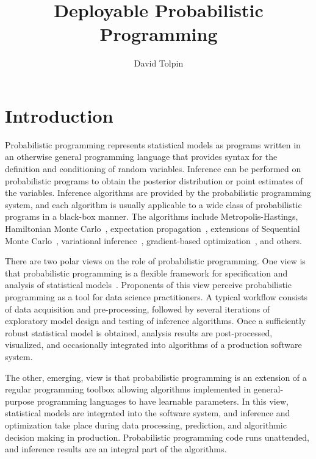 \documentclass[sigplan,review,10pt,anonymous]{acmart}
\title{Deployable Probabilistic Programming}
\author{David Tolpin}
\affiliation{
    \institution{PUB+}
    \country{Israel}
}
\begin{document}
\maketitle

\begin{sloppypar}

\section{Introduction}

	Probabilistic programming \cite{GMR+08,MSP14,WVM14,GS15}
	represents statistical models as programs written in an
	otherwise general programming language that provides syntax
	for the definition and conditioning of random variables.
	Inference can be performed on probabilistic programs to
	obtain the posterior distribution or point estimates of the
	variables. Inference algorithms are provided by the
	probabilistic programming system, and each algorithm is
	usually applicable to a wide class of probabilistic programs
	in a black-box manner. The algorithms include
	Metropolis-Hastings\cite{WSG11,MSP14,YHG14}, Hamiltonian
	Monte Carlo~\cite{Stan17}, expectation
	propagation~\cite{MWG+10}, extensions of Sequential Monte
	Carlo~\cite{WVM14,MYM+15,PWD+14,RNL+2016}, variational
	inference~\cite{WW13,KTR+17}, gradient-based
	optimization~\cite{Stan17,BCJ+19}, and others.

	There are two polar views on the role of probabilistic
	programming.  One view is that probabilistic programming is
	a flexible framework for specification and analysis of
	statistical models~\cite{WSG11,TMY+16,GXG18}. Proponents of
	this view perceive probabilistic programming as a tool for
	data science practitioners. A typical workflow consists of
	data acquisition and pre-processing, followed by several
	iterations of exploratory model design and testing of
	inference algorithms. Once a sufficiently robust statistical
	model is obtained, analysis results are post-processed,
	visualized, and occasionally integrated into algorithms of a
	production software system. 

	The other, emerging, view is that probabilistic programming
	is an extension of a regular programming toolbox allowing
	algorithms implemented in general-purpose programming languages to
	have learnable parameters. In this view, statistical models
	are integrated into the software system, and inference and
	optimization take place during data processing, prediction,
	and algorithmic decision making in production.
	Probabilistic programming code runs unattended, and
	inference results are an integral part of the algorithms.


\end{sloppypar}
\end{document}
